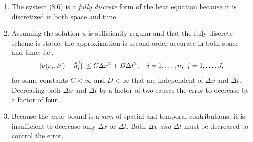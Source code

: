 \begin{enumerate}
    \item The system (8.6) is a \textit{fully discrete} form of the heat equation because it is discretized in both space and time.
    \item Assuming the solution $u$ is sufficiently regular and that the fully discrete scheme is stable, the approximation is second-order accurate in both space and time; i.e.,
    \[\|u(x_i, t^j) - \tilde{\tilde{u}}_i^j\| \leq C\Delta x^2 + D\Delta t^2, \quad i = 1, \dots, n, \ j = 1, \dots, J,\]
    for some constants $C < \infty$ and $D < \infty$ that are independent of $\Delta x$ and $\Delta t$. Decreasing both $\Delta x$ and $\Delta t$ by a factor of two causes the error to decrease by a factor of four.
    \item Because the error bound is a \textit{sum} of spatial and temporal contributions, it is insufficient to decrease only $\Delta x$ or $\Delta t$. Both $\Delta x$ \textit{and} $\Delta t$ must be decreased to control the error.
\end{enumerate}

